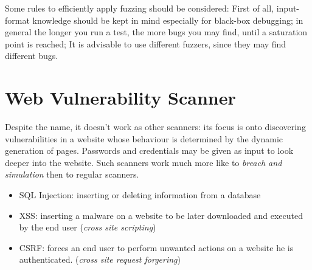 Some rules to efficiently apply fuzzing should be considered:
First of all, input-format knowledge should be kept in mind especially for black-box debugging;
in general the longer you run a test, the more bugs you may find, until a saturation point is reached;
It is advisable to use different fuzzers, since they may find different bugs.

\section{Web Vulnerability Scanner}
Despite the name, it doesn't work as other scanners: 
its focus is onto discovering vulnerabilities in a website whose behaviour is determined by the dynamic generation of pages.
Passwords and credentials may be given as input to look deeper into the website.
Such scanners work much more like to \textit{breach and simulation} then to regular scanners.

\begin{itemize}
    \item SQL Injection: inserting or deleting information from a database
    \item XSS: inserting a malware on a website to be later downloaded and executed by the end user (\textit{cross site scripting})
    \item CSRF: forces an end user to perform unwanted actions on a website he is authenticated. (\textit{cross site request forgering}) 
\end{itemize}
